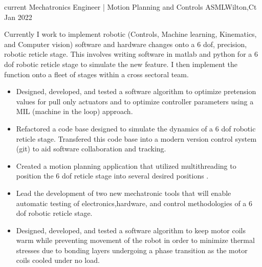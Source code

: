 \begin{experiences}

\experience
  {current}      {Mechatronics Engineer |  Motion Planning and Controls }{ASML}{Wilton,Ct}
  {Jan 2022} {
                  Currently I work to implement robotic (Controls, Machine learning, Kinematics, and Computer vision) software and hardware changes onto a 6 dof, precision, robotic reticle stage. This involves writing software in matlab and python for a 6 dof robotic reticle stage to simulate the new feature. I then implement the function onto a fleet of stages within a cross sectoral team. 
			\begin{itemize}
		\item Designed, developed, and tested  a software algorithm to optimize pretension values for pull only actuators and to optimize controller parameters using a MIL (machine in the loop) approach.
	\item Refactored a code base designed to simulate the dynamics of a 6 dof robotic reticle stage. Transfered this code base into a modern version control system (git) to aid software collaboration and tracking.
                       \item Created a motion planning application that utilized multithreading to position the 6 dof reticle stage into several desired positions  .
		    \item Lead the development of two new mechatronic tools that will enable automatic testing of electronics,hardware, and control methodologies of a 6 dof robotic reticle stage.
		 \item Designed, developed, and tested a software algorithm to keep motor coils warm while preventing movement of the robot in order to minimize thermal stresses due to bonding layers undergoing a phase transition as the motor coils cooled under no load.
		

\end{itemize}}
\end{experiences}
